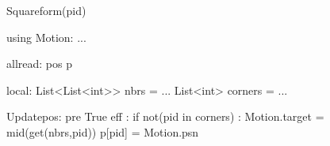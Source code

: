 Squareform(pid)

using Motion:
...

allread:
  pos p$\label{shapeformp}$

local:
  List<List<int>> nbrs = ...
  List<int> corners = ...
  

Updatepos:
  pre True
  eff :
     if not(pid in corners) :
        Motion.target = mid(get(nbrs,pid))
    p[pid] = Motion.psn

    
